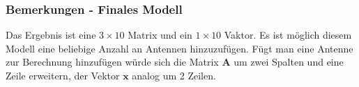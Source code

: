 {\subsubsection{Bemerkungen - Finales Modell}
%
Das Ergebnis ist eine $3\times10$ Matrix und ein $1\times10$ Vaktor. Es ist möglich diesem Modell eine beliebige Anzahl an Antennen hinzuzufügen. Fügt man eine Antenne zur Berechnung hinzufügen würde sich die Matrix $\mathbf{A}$ um zwei Spalten und eine Zeile erweitern, der Vektor $\mathbf{x}$ analog um 2 Zeilen.

}